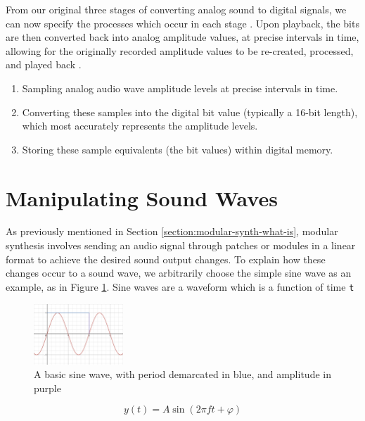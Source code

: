 From our original three stages of converting analog sound to digital signals, we can now specify the processes which occur in each stage \cite{Huber_Runstein_2018}. Upon playback, the bits are then converted back into analog amplitude values, at precise intervals in time, allowing for the originally recorded amplitude values to be re-created, processed, and played back \cite{Huber_Runstein_2018}. 

\begin{enumerate}
	\item Sampling analog audio wave amplitude levels at precise intervals in time.
	\item Converting these samples into the digital bit value (typically a 16-bit length), which most accurately represents the amplitude levels.
	\item Storing these sample equivalents (the bit values) within digital memory.
\end{enumerate}


\section{Manipulating Sound Waves}\label{section:manip-waves}
As previously mentioned in Section \ref{section:modular-synth-what-is}, modular synthesis involves sending an audio signal through patches or modules in a linear format to achieve the desired sound output changes. To explain how these changes occur to a sound wave, we arbitrarily choose the simple sine wave as an example, as in Figure \ref{fig:sine-wave-period-amplitude}. Sine waves are a waveform which is a function of time \texttt{t}

\begin{figure}[ht]
	\centering
	\includegraphics[width=0.3\textwidth]{figures/sine-wave-period-amplitude.png}
	\caption{A basic sine wave, with period demarcated in blue, and amplitude in purple}
	\label{fig:sine-wave-period-amplitude}
\end{figure}

\begin{equation}\label{eq:full-sine-wave-equation}
	y(t) = A \sin(2\pi ft + \varphi)
\end{equation}

